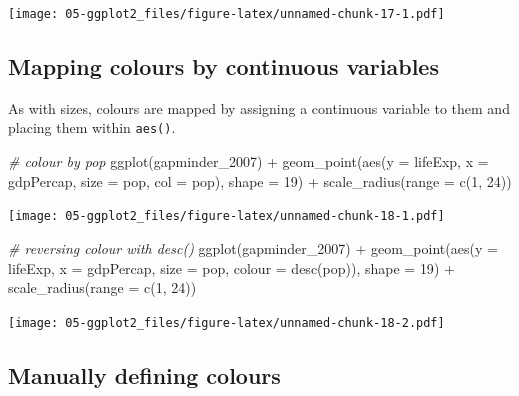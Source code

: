 \documentclass[
]{book}
\newenvironment{Shaded}{\begin{snugshade}}{\end{snugshade}}
\newcommand{\AttributeTok}[1]{\textcolor[rgb]{0.77,0.63,0.00}{#1}}
\newcommand{\CommentTok}[1]{\textcolor[rgb]{0.56,0.35,0.01}{\textit{#1}}}
\newcommand{\DecValTok}[1]{\textcolor[rgb]{0.00,0.00,0.81}{#1}}
\newcommand{\FunctionTok}[1]{\textcolor[rgb]{0.00,0.00,0.00}{#1}}
\newcommand{\NormalTok}[1]{#1}
\newcommand{\SpecialCharTok}[1]{\textcolor[rgb]{0.00,0.00,0.00}{#1}}
\begin{document}
\texttt{[image: 05-ggplot2\_files/figure-latex/unnamed-chunk-17-1.pdf]}

\hypertarget{mapping-colours-by-continuous-variables}{%
\subsection{Mapping colours by continuous variables}\label{mapping-colours-by-continuous-variables}}

As with sizes, colours are mapped by assigning a continuous variable to them and placing them within \texttt{aes()}.

\begin{Shaded}
\begin{Highlighting}[]
\CommentTok{\# colour by pop}
\FunctionTok{ggplot}\NormalTok{(gapminder\_2007) }\SpecialCharTok{+} 
  \FunctionTok{geom\_point}\NormalTok{(}\FunctionTok{aes}\NormalTok{(}\AttributeTok{y =}\NormalTok{ lifeExp, }\AttributeTok{x =}\NormalTok{ gdpPercap, }\AttributeTok{size =}\NormalTok{ pop, }\AttributeTok{col =}\NormalTok{ pop), }\AttributeTok{shape =} \DecValTok{19}\NormalTok{) }\SpecialCharTok{+}
  \FunctionTok{scale\_radius}\NormalTok{(}\AttributeTok{range =} \FunctionTok{c}\NormalTok{(}\DecValTok{1}\NormalTok{, }\DecValTok{24}\NormalTok{))}
\end{Highlighting}
\end{Shaded}

\texttt{[image: 05-ggplot2\_files/figure-latex/unnamed-chunk-18-1.pdf]}

\begin{Shaded}
\begin{Highlighting}[]
\CommentTok{\# reversing colour with desc()}
\FunctionTok{ggplot}\NormalTok{(gapminder\_2007) }\SpecialCharTok{+} 
  \FunctionTok{geom\_point}\NormalTok{(}\FunctionTok{aes}\NormalTok{(}\AttributeTok{y =}\NormalTok{ lifeExp, }\AttributeTok{x =}\NormalTok{ gdpPercap, }\AttributeTok{size =}\NormalTok{ pop, }\AttributeTok{colour =} \FunctionTok{desc}\NormalTok{(pop)), }\AttributeTok{shape =} \DecValTok{19}\NormalTok{) }\SpecialCharTok{+}
  \FunctionTok{scale\_radius}\NormalTok{(}\AttributeTok{range =} \FunctionTok{c}\NormalTok{(}\DecValTok{1}\NormalTok{, }\DecValTok{24}\NormalTok{))}
\end{Highlighting}
\end{Shaded}

\texttt{[image: 05-ggplot2\_files/figure-latex/unnamed-chunk-18-2.pdf]}

\hypertarget{manually-defining-colours}{%
\subsection{Manually defining colours}\label{manually-defining-colours}}
\end{document}
